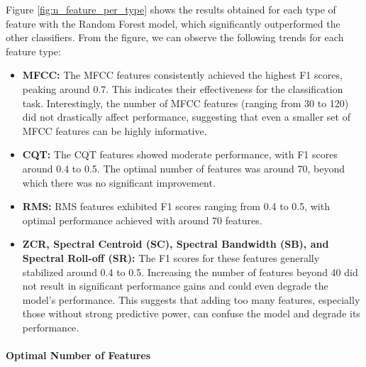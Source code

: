 \noindent
Figure \ref{fig:n_feature_per_type} shows the results obtained for each type of feature with the Random Forest model,
which significantly outperformed the other classifiers.
From the figure, we can observe the following trends for each feature type:
\begin{itemize}
    \item \textbf{MFCC:} The MFCC features consistently achieved the highest F1 scores, peaking around 0.7.
          This indicates their effectiveness for the classification task. Interestingly, the number of MFCC features (ranging from 30 to 120)
          did not drastically affect performance, suggesting that even a smaller set of MFCC features can be highly informative.
    \item \textbf{CQT:} The CQT features showed moderate performance, with F1 scores around 0.4 to 0.5. The optimal number of features was around 70,
          beyond which there was no significant improvement.
    \item \textbf{RMS:} RMS features exhibited F1 scores ranging from 0.4 to 0.5, with optimal performance achieved with around 70 features.
    \item \textbf{ZCR, Spectral Centroid (SC), Spectral Bandwidth (SB), and Spectral Roll-off (SR):}
          The F1 scores for these features generally stabilized around 0.4 to 0.5.
          Increasing the number of features beyond 40 did not result in significant performance gains and could even degrade the model's performance.
          This suggests that adding too many features, especially those without strong predictive power, can confuse the model and degrade its performance.
\end{itemize}
\paragraph{Optimal Number of Features}

